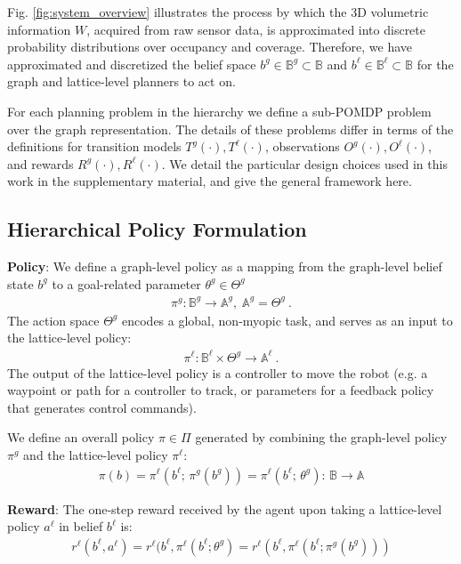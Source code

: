 \documentclass[letterpaper]{article} %
\newcommand{\ph}[1]{{\textbf{#1}:}} %
\begin{document}
Fig. \ref{fig:system_overview} illustrates the process by which the 3D volumetric information $W$, acquired from raw sensor data, is approximated into discrete probability distributions over occupancy and coverage. 
Therefore, we have approximated and discretized the belief space $b^g\in\mathbb{B}^g\subset\mathbb{B}$ and $b^\ell\in\mathbb{B}^\ell\subset\mathbb{B}$ for the graph and lattice-level planners to act on.

For each planning problem in the hierarchy we define a sub-POMDP problem over the graph representation.  The details of these problems differ in terms of the definitions for transition models $T^g(\cdot),T^\ell(\cdot)$, observations $O^g(\cdot),O^\ell(\cdot)$, and rewards $R^g(\cdot),R^\ell(\cdot)$.  We detail the particular design choices used in this work in the supplementary material, and give the general framework here.

\subsection{Hierarchical Policy Formulation}
\label{sec:hierarchical_policy}
\ph{Policy} We define a graph-level policy as a mapping from the graph-level belief state $b^g$ to a goal-related parameter $\theta^g \in \Theta^g$ 
\begin{align}
    \pi^g : \mathbb{B}^g \to \mathbb{A}^g, \; \mathbb{A}^g = \Theta^g\ .
\end{align}
The action space $\Theta^g$ encodes a global, non-myopic task, and serves as an input to the lattice-level policy: 
\begin{align}
    \pi^\ell: \mathbb{B}^\ell \times \Theta^g \to \mathbb{A}^\ell\ .
\end{align}
The output of the lattice-level policy is a controller to move the robot (e.g. a waypoint or path for a controller to track, or parameters for a feedback policy that generates control commands).

We define an overall policy $\pi \in \Pi$ generated by combining the graph-level policy $\pi^g$ and the lattice-level policy $\pi^\ell$:
\begin{align}
    \pi(b) = \pi^\ell(b^\ell; \, \pi^g(b^g)) = \pi^\ell(b^\ell; \, \theta^g) : \, \mathbb{B}\rightarrow \mathbb{A} 
\end{align}

\ph{Reward} The one-step reward received by the agent upon taking a lattice-level policy $a^\ell$ in belief $b^\ell$ is:
\begin{align}
    r^\ell(b^\ell, a^\ell) = r^\ell(b^\ell, \pi^\ell(b^\ell; \theta^g) = r^\ell(b^\ell, \pi^\ell(b^\ell; \pi^g(b^g)))
    \label{eq:reward}
\end{align}
\end{document}
